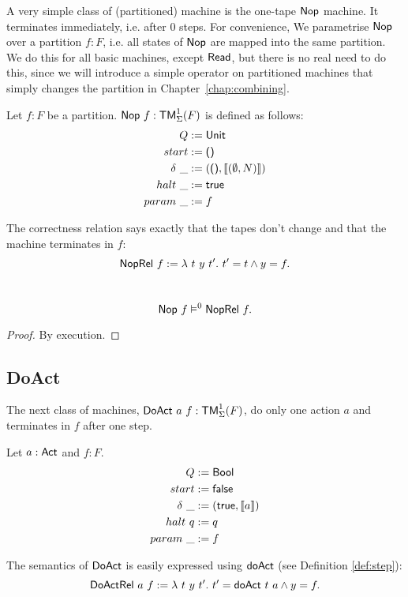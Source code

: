 A very simple class of (partitioned) machine is the one-tape $\textsf{Nop}$ machine.  It terminates immediately, i.e. after 0 steps.  For convenience, We
parametrise $\textsf{Nop}$ over a partition $f:F$, i.e. all states of $\textsf{Nop}$ are mapped into the same partition.  We do this for all basic machines,
except $\textsf{Read}$, but there is no real need to do this, since we will introduce a simple operator on partitioned machines that simply changes the
partition in Chapter~\ref{chap:combining}.
\begin{definition}[Nop]
  \label{def:Nop}
  Let $f:F$ be a partition.  $\textsf{Nop}~f: \textsf{TM}_\Sigma^1(F)$ is defined as follows:
  \begin{align*}
    Q          &:= \textsf{Unit} \\
    start      &:= \textsf{()} \\
    \delta ~\_ &:= (\textsf{()}, \left\llbracket (\emptyset, N) \right\rrbracket) \\
    halt   ~\_ &:= \textsf{true} \\
    param  ~\_ &:= f
  \end{align*}
\end{definition}
The correctness relation says exactly that the tapes don't change and that the machine terminates in $f$:
\[
  \textsf{NopRel}~f := \lambda~t~y~t'.~ t' = t \land y = f.
\]
\begin{lemma}
  \label{lem:Nop_Sem}
  ~
  \[
    \textsf{Nop}~f \vDash^0 \textsf{NopRel}~f.
  \]
\end{lemma}
\begin{proof}
  By execution.
\end{proof}

\subsection{DoAct}
\label{sec:DoAct}

The next class of machines, $\textsf{DoAct}~a~f : \textsf{TM}_\Sigma^1(F)$, do only one action $a$ and terminates in $f$ after one step.
\begin{definition}[$\MS{DoAct}~a~f$]
  \label{def:DoAct}
  Let $a:\textsf{Act}$ and $f:F$.
  \begin{align*}
    Q          &:= \textsf{Bool} \\
    start      &:= \textsf{false} \\
    \delta ~\_ &:= (\textsf{true}, \left\llbracket a \right\rrbracket) \\
    halt   ~ q &:= q \\
    param  ~\_ &:= f
  \end{align*}
\end{definition}
The semantics of $\textsf{DoAct}$ is easily expressed using $\textsf{doAct}$ (see Definition \ref{def:step}):
\[
  \textsf{DoActRel}~a~f := \lambda~t~y~t'.~ t' = \textsf{doAct}~t~a \land y = f.
\]

